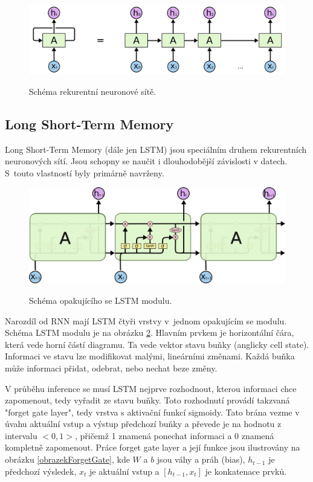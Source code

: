 \begin{figure}[h]\centering
    \centering
    \includegraphics[width=0.6\linewidth]{obrazky/RNNSchema.png}\\[1pt]  
    \caption{Schéma rekurentní neuronové sítě. \cite{colah_lstm}}    
    \label{obrazekSchemaRekurentniNeuronoveSite}
\end{figure}

\subsection{Long Short-Term Memory}
\label{lstmTeorie}
Long Short-Term Memory (dále jen LSTM) 
jsou speciálním druhem rekurentních neuronových sítí.
Jsou schopny se naučit i dlouhodobější závislosti v datech.
S~touto vlastností byly primárně navrženy.\cite{colah_lstm}
\par

\begin{figure}[h]\centering
    \centering
    \includegraphics[width=0.8\linewidth]{obrazky/LSTM3-chain.png}\\[1pt]  
    \caption{Schéma opakujícího se LSTM modulu. \cite{colah_lstm}}    
    \label{obrazekLSTMBunka}
\end{figure}

Narozdíl od RNN mají LSTM čtyři vrstvy v~jednom opakujícím se modulu.
Schéma LSTM modulu je na obrázku \ref{obrazekLSTMBunka}.
Hlavním prvkem je horizontální čára,
která vede horní částí diagramu.
Ta vede vektor stavu buňky (anglicky cell state).
Informaci ve stavu lze modifikovat malými, lineárními změnami.
Každá buňka může informaci přidat, odebrat, nebo nechat beze změny.\cite{colah_lstm}
\par

V průběhu inference se musí LSTM nejprve rozhodnout,
kterou informaci chce zapomenout, 
tedy vyřadit ze stavu buňky.
Toto rozhodnutí provádí takzvaná "forget gate layer",
tedy vrstva s aktivační funkcí sigmoidy.
Tato brána vezme v úvahu aktuální vstup a výstup předchozí buňky
a převede je na hodnotu z intervalu $<0,1>$,
přičemž 1 znamená ponechat informaci
a 0 znamená kompletně zapomenout.
Práce forget gate layer a její funkce jsou ilustrovány na obrázku 
\ref{obrazekForgetGate}, kde $W$ a $b$ jsou váhy a práh (bias),
$h_{t-1}$ je předchozí výsledek, $x_t$ je aktuální vstup a 
$[h_{t-1}, x_t]$ je konkatenace prvků.\cite{colah_lstm}

